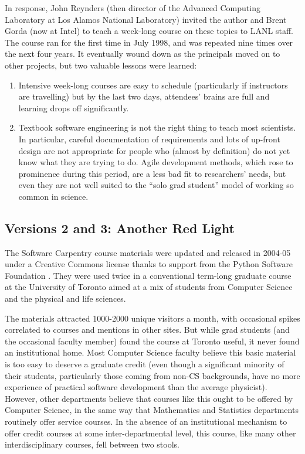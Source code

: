 \documentclass[10pt,a4paper,twocolumn]{article}
\begin{document}
In response, John Reynders (then director of the Advanced Computing
Laboratory at Los Alamos National Laboratory) invited the author and
Brent Gorda (now at Intel) to teach a week-long course on these topics
to LANL staff. The course ran for the first time in July 1998, and was
repeated nine times over the next four years. It eventually wound down
as the principals moved on to other projects, but two valuable lessons
were learned:

\begin{enumerate}
\item
  Intensive week-long courses are easy to schedule (particularly if
  instructors are travelling) but by the last two days, attendees'
  brains are full and learning drops off significantly.
\item
  Textbook software engineering is not the right thing to teach most
  scientists. In particular, careful documentation of requirements and
  lots of up-front design are not appropriate for people who (almost by
  definition) do not yet know what they are trying to do. Agile
  development methods, which rose to prominence during this period, are
  a less bad fit to researchers' needs, but even they are not well
  suited to the ``solo grad student'' model of working so common in
  science.
\end{enumerate}

\subsection*{Versions 2 and 3: Another Red Light}

The Software Carpentry course materials were updated and released in
2004-05 under a Creative Commons license thanks to support from the
Python Software Foundation \cite{wilson2006b}. They were used twice in
a conventional term-long graduate course at the University of Toronto
aimed at a mix of students from Computer Science and the physical and
life sciences.

The materials attracted 1000-2000 unique visitors a month, with
occasional spikes correlated to courses and mentions in other
sites. But while grad students (and the occasional faculty member)
found the course at Toronto useful, it never found an institutional
home.  Most Computer Science faculty believe this basic material is
too easy to deserve a graduate credit (even though a significant
minority of their students, particularly those coming from non-CS
backgrounds, have no more experience of practical software development
than the average physicist). However, other departments believe that
courses like this ought to be offered by Computer Science, in the same
way that Mathematics and Statistics departments routinely offer
service courses.  In the absence of an institutional mechanism to
offer credit courses at some inter-departmental level, this course,
like many other interdisciplinary courses, fell between two stools.
\end{document}

